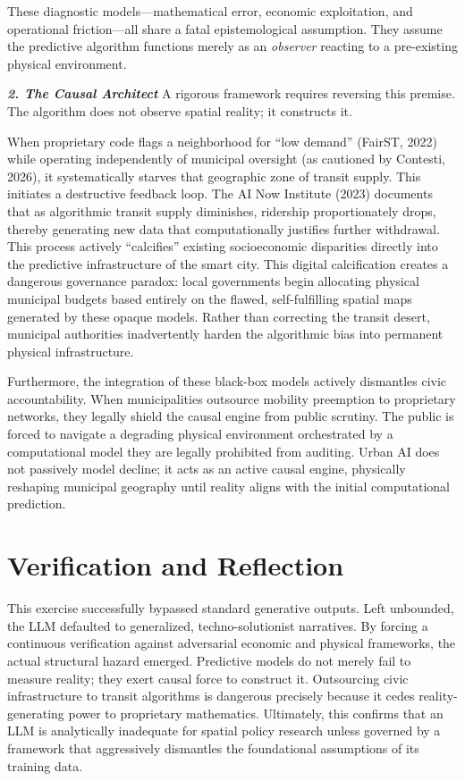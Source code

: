 \documentclass[11pt, twocolumn]{article}
\begin{document}
These diagnostic models---mathematical error, economic exploitation, and operational friction---all share a fatal epistemological assumption. They assume the predictive algorithm functions merely as an \textit{observer} reacting to a pre-existing physical environment.

\textbf{\textit{2. The Causal Architect}}
A rigorous framework requires reversing this premise. The algorithm does not observe spatial reality; it constructs it. 

When proprietary code flags a neighborhood for ``low demand'' (FairST, 2022) while operating independently of municipal oversight (as cautioned by Contesti, 2026), it systematically starves that geographic zone of transit supply. This initiates a destructive feedback loop. The AI Now Institute (2023) documents that as algorithmic transit supply diminishes, ridership proportionately drops, thereby generating new data that computationally justifies further withdrawal. This process actively ``calcifies'' existing socioeconomic disparities directly into the predictive infrastructure of the smart city. This digital calcification creates a dangerous governance paradox: local governments begin allocating physical municipal budgets based entirely on the flawed, self-fulfilling spatial maps generated by these opaque models. Rather than correcting the transit desert, municipal authorities inadvertently harden the algorithmic bias into permanent physical infrastructure.

Furthermore, the integration of these black-box models actively dismantles civic accountability. When municipalities outsource mobility preemption to proprietary networks, they legally shield the causal engine from public scrutiny. The public is forced to navigate a degrading physical environment orchestrated by a computational model they are legally prohibited from auditing. Urban AI does not passively model decline; it acts as an active causal engine, physically reshaping municipal geography until reality aligns with the initial computational prediction.

\section*{Verification and Reflection}
This exercise successfully bypassed standard generative outputs. Left unbounded, the LLM defaulted to generalized, techno-solutionist narratives. By forcing a continuous verification against adversarial economic and physical frameworks, the actual structural hazard emerged. Predictive models do not merely fail to measure reality; they exert causal force to construct it. Outsourcing civic infrastructure to transit algorithms is dangerous precisely because it cedes reality-generating power to proprietary mathematics. Ultimately, this confirms that an LLM is analytically inadequate for spatial policy research unless governed by a framework that aggressively dismantles the foundational assumptions of its training data.
\end{document}
